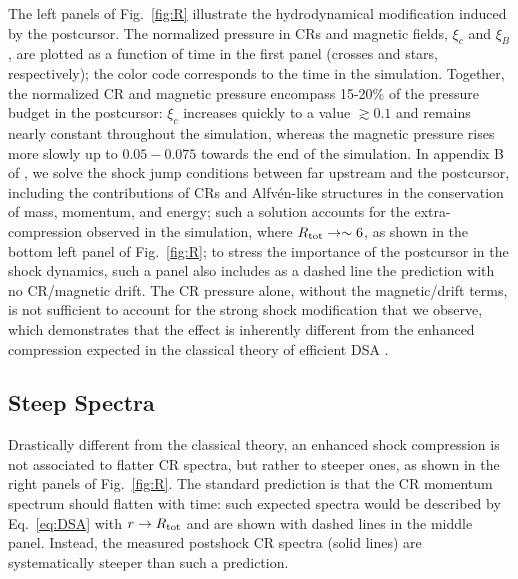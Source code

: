 \documentclass[varenna]{cimento}
\newcommand{\rt}{R_{\rm tot}}
\begin{document}
The left panels of Fig.~\ref{fig:R} illustrate the hydrodynamical modification induced by the postcursor. 
The normalized pressure in CRs and magnetic fields, $\xi_c$ and $\xi_B$, are plotted as a function of time in the first panel (crosses and stars, respectively);
the color code corresponds to the time in the simulation.
Together, the normalized CR and magnetic pressure encompass 15-20\% of the pressure budget in the postcursor:
$\xi_c$ increases quickly to a value $\gtrsim 0.1$ and remains nearly constant throughout the simulation, whereas the magnetic pressure rises more slowly up to $0.05-0.075$ towards the end of the simulation.
In appendix B of \cite{haggerty+20}, we solve the shock jump conditions between far upstream and the postcursor, including the contributions of CRs and Alfv\'en-like structures in the conservation of mass, momentum, and energy; 
such a solution accounts for the extra-compression observed in the simulation, where $\rt\to\sim 6$, as shown in the bottom left panel of Fig.~\ref{fig:R};
to stress the importance of the postcursor in the shock dynamics, such a panel also includes as a dashed line the prediction with no CR/magnetic drift. 
The CR pressure alone, without the magnetic/drift terms, is not sufficient to account for the strong shock modification that we observe, which demonstrates that the effect is inherently different from the enhanced compression expected in the classical theory of efficient DSA \cite{jones+91,malkov+01}.

\subsection{Steep Spectra}
Drastically different from the classical theory, an enhanced shock compression is not associated to flatter CR spectra, but rather to steeper ones, as shown in the right panels of Fig.~\ref{fig:R}. 
The standard prediction is that the CR momentum spectrum should flatten with time: such expected spectra would be described by Eq.~\ref{eq:DSA} with $r\to \rt$ and are shown with dashed lines in the middle panel.
Instead, the measured postshock CR spectra (solid lines) are systematically steeper than such a prediction.
\end{document}
